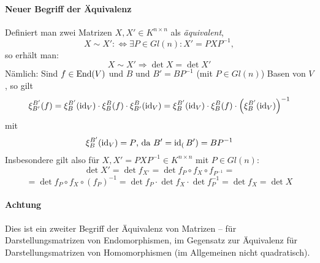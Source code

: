 \paragraph{Neuer Begriff der Äquivalenz}
	Definiert man zwei Matrizen $ X,X' \in K^{n\times n}$ als \emph{äquivalent},
		\[ X\sim X' :\Leftrightarrow \exists P\in Gl(n): X' =PXP^{-1}, \]
	so erhält man:
		\[ X\sim X' \Rightarrow \det X = \det X' \]
	Nämlich: Sind $ f\in \operatorname{End}(V) $ und $ B $ und $ B'=BP^{-1} $ (mit $ P\in Gl(n) $) Basen von $ V $, so gilt
		\[ \xi_{B'}^{B'}(f) = \xi_{B}^{B'}(\operatorname{id}_V)\cdot \xi_B^B(f)\cdot \xi_{B'}^{B}(\operatorname{id}_V) =
		\xi_{B}^{B'}(\operatorname{id}_V)\cdot \xi_B^B(f)\cdot \left(\xi^{B'}_{B}(\operatorname{id}_V)\right)^{-1} \]
	mit
		\[ \xi_B^{B'}(\operatorname{id}_V) = P \text{, da } B' = \operatorname{id}_(B') = BP^{-1} \]
	Insbesondere gilt also für $ X,X' = PXP^{-1}\in K^{n\times n} $ mit $ P\in Gl(n) $:
		\[ \det X' = \det f_{X'} = \det f_P \circ f_X \circ f_{P^{-1}} =\]
		\[=\det f_P \circ f_X \circ (f_P)^{-1} = \det f_P \cdot \det f_X \cdot \det f_P^{-1} = \det f_X = \det X\]
\paragraph{Achtung}
	Dies ist ein zweiter Begriff der Äquivalenz von Matrizen -- für Darstellungsmatrizen von Endomorphismen, im Gegensatz zur Äquivalenz für Darstellungsmatrizen von Homomorphismen (im Allgemeinen nicht quadratisch).